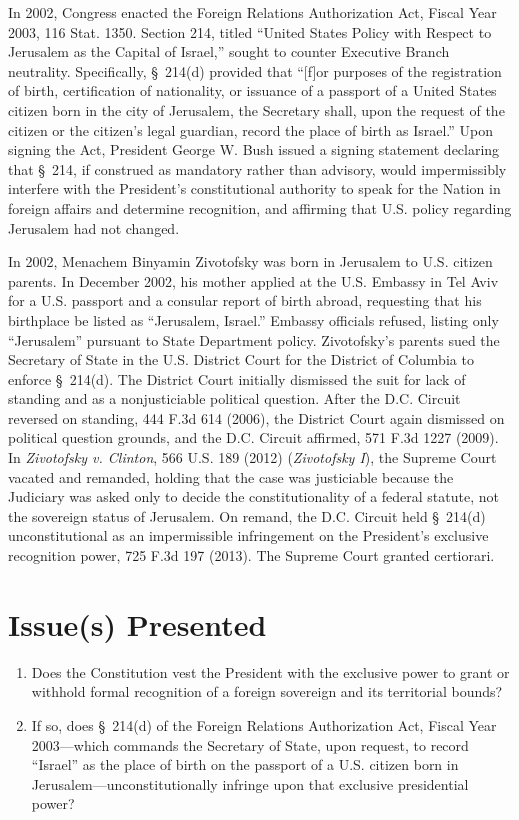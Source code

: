 \documentclass[12pt]{article}
\begin{document}
In 2002, Congress enacted the Foreign Relations Authorization Act, Fiscal Year 2003, 116 Stat. 1350. Section 214, titled ``United States Policy with Respect to Jerusalem as the Capital of Israel,'' sought to counter Executive Branch neutrality. Specifically, \S~214(d) provided that ``[f]or purposes of the registration of birth, certification of nationality, or issuance of a passport of a United States citizen born in the city of Jerusalem, the Secretary shall, upon the request of the citizen or the citizen's legal guardian, record the place of birth as Israel.'' Upon signing the Act, President George W. Bush issued a signing statement declaring that \S~214, if construed as mandatory rather than advisory, would impermissibly interfere with the President's constitutional authority to speak for the Nation in foreign affairs and determine recognition, and affirming that U.S. policy regarding Jerusalem had not changed.

In 2002, Menachem Binyamin Zivotofsky was born in Jerusalem to U.S. citizen parents. In December 2002, his mother applied at the U.S. Embassy in Tel Aviv for a U.S. passport and a consular report of birth abroad, requesting that his birthplace be listed as ``Jerusalem, Israel.'' Embassy officials refused, listing only ``Jerusalem'' pursuant to State Department policy. Zivotofsky's parents sued the Secretary of State in the U.S. District Court for the District of Columbia to enforce \S~214(d). The District Court initially dismissed the suit for lack of standing and as a nonjusticiable political question. After the D.C. Circuit reversed on standing, 444 F.3d 614 (2006), the District Court again dismissed on political question grounds, and the D.C. Circuit affirmed, 571 F.3d 1227 (2009). In \textit{Zivotofsky v. Clinton}, 566 U.S. 189 (2012) (\textit{Zivotofsky I}), the Supreme Court vacated and remanded, holding that the case was justiciable because the Judiciary was asked only to decide the constitutionality of a federal statute, not the sovereign status of Jerusalem. On remand, the D.C. Circuit held \S~214(d) unconstitutional as an impermissible infringement on the President's exclusive recognition power, 725 F.3d 197 (2013). The Supreme Court granted certiorari.

\section{Issue(s) Presented}
\begin{enumerate}
  \item Does the Constitution vest the President with the exclusive power to grant or withhold formal recognition of a foreign sovereign and its territorial bounds?
  \item If so, does \S~214(d) of the Foreign Relations Authorization Act, Fiscal Year 2003---which commands the Secretary of State, upon request, to record ``Israel'' as the place of birth on the passport of a U.S. citizen born in Jerusalem---unconstitutionally infringe upon that exclusive presidential power?
\end{enumerate}
\end{document}
